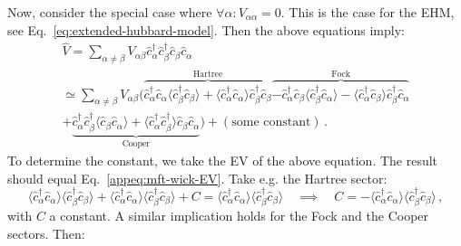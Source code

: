 Now, consider the special case where $\forall \alpha \colon V_{\alpha\alpha}=0$. This is the case for the EHM, see Eq.~\eqref{eq:extended-hubbard-model}. Then the above equations imply:
\begin{multline*}
	\hat V = \sum_{\alpha\neq\beta} V_{\alpha\beta} \hat c_\alpha^\dagger \hat c_\beta^\dagger \hat c_\beta \hat c_\alpha \\
	\simeq \sum_{\alpha\neq\beta} V_{\alpha\beta} \Big(
	\overbrace{
		\hat c_\alpha^\dagger \hat c_\alpha \big\langle \hat c_\beta^\dagger \hat c_\beta \big\rangle + \big\langle \hat c_\alpha^\dagger \hat c_\alpha \big\rangle \hat c_\beta^\dagger \hat c_\beta
	}^{\text{Hartree}} \overbrace{
		- \hat c_\alpha^\dagger \hat c_\beta \big\langle \hat c_\beta^\dagger \hat c_\alpha \big\rangle - \big\langle \hat c_\alpha^\dagger \hat c_\beta \big\rangle \hat c_\beta^\dagger \hat c_\alpha
	}^{\text{Fock}} \\	
	+ \underbrace{
		\hat c_\alpha^\dagger \hat c_\beta^\dagger \big\langle \hat c_\beta \hat c_\alpha \big\rangle + \big\langle \hat c_\alpha^\dagger \hat c_\beta^\dagger \big\rangle \hat c_\beta \hat c_\alpha
	}_{\text{Cooper}}
	\Big) + (\text{some constant}) \, .
\end{multline*}
To determine the constant, we take the EV of the above equation. The result should equal Eq.~\eqref{appeq:mft-wick-EV}. Take e.g. the Hartree sector:
\[
\big\langle \hat c_\alpha^\dagger \hat c_\alpha \big\rangle \big\langle \hat c_\beta^\dagger \hat c_\beta \big\rangle + \big\langle \hat c_\alpha^\dagger \hat c_\alpha \big\rangle \big\langle \hat c_\beta^\dagger \hat c_\beta \big\rangle + C = \big\langle \hat c_\alpha^\dagger \hat c_\alpha \big\rangle  \big\langle \hat c_\beta^\dagger \hat c_\beta \big\rangle 
\quad\implies\quad
C = - \big\langle \hat c_\alpha^\dagger \hat c_\alpha \big\rangle  \big\langle \hat c_\beta^\dagger \hat c_\beta \big\rangle \, ,
\]
with $C$ a constant. A similar implication holds for the Fock and the Cooper sectors. Then:
